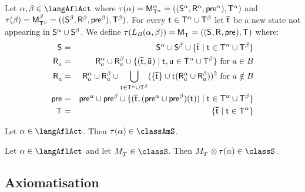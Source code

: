 \begin{definition}[Learning]\label{afl-s-learning}
Let $\alpha, \beta \in \langAflAct$ where $\tau(\alpha) = \aPModel[\alpha]{\aStatesT[\alpha]} = \aPModelTuple[\alpha]{\aStatesT[\alpha]}$ and $\tau(\beta) = \aPModel[\beta]{\aStatesT[\beta]} = \aPModelTuple[\beta]{\aStatesT[\beta]}$.
For every $\aStateT \in \aStatesT[\alpha] \cup \aStatesT[\beta]$ let $\aPStateT$ be a new state not appearing in $\aStates[\alpha] \cup \aStates[\beta]$.
We define $\tau(\learnsBs (\alpha, \beta)) = \aPModel{\aStatesT} = \aPModelTuple{\aStatesT}$ where:
\begin{eqnarray*}
    \aStates &=& \aStates[\alpha] \cup \aStates[\beta] \cup \{\aPStateT \mid \aStateT \in \aStatesT[\alpha] \cup \aStatesT[\beta]\}\\
    \aAccessibility{\agentA} &=& \aAccessibility[\alpha]{\agentA} \cup \aAccessibility[\beta]{\agentA} \cup \{(\aPStateT, \aPStateU) \mid \aStateT, \aStateU \in \aStatesT[\alpha] \cup \aStatesT[\beta]\} \text{ for } \agentA \in \agentsB\\
    \aAccessibility{\agentA} &=& \aAccessibility[\alpha]{\agentA} \cup \aAccessibility[\beta]{\agentA} \cup \bigcup_{\aStateT \in \aStatesT[\alpha] \cup \aStatesT[\beta]} (\{\aPStateT\} \cup \aStateT (\aAccessibility[\alpha]{\agentA} \cup \aAccessibility[\beta]{\agentA}))^2 \text{ for } \agentA \notin \agentsB\\
    \aPrecondition &=& \aPrecondition[\alpha] \cup \aPrecondition[\beta] \cup \{(\aPStateT, (\aPrecondition[\alpha] \cup \aPrecondition[\beta])(\aStateT)) \mid \aStateT \in \aStatesT[\alpha] \cup \aStatesT[\beta]\}\\
    \aStatesT &=& \{\aPStateT \mid \aStateT \in \aStatesT[\alpha]\}
\end{eqnarray*}
\end{definition}

\begin{lemma}\label{afl-s-structure}
Let $\alpha \in \langAflAct$. Then $\tau(\alpha) \in \classAmS$.
\end{lemma}

\begin{lemma}\label{afl-s-exec}
Let $\alpha \in \langAflAct$ and 
let $\kPModel{\kStatesT} \in \classS$.
Then $\kPModel{\kStatesT} \exec \tau(\alpha) \in \classS$.
\end{lemma}

\subsection{Axiomatisation}

